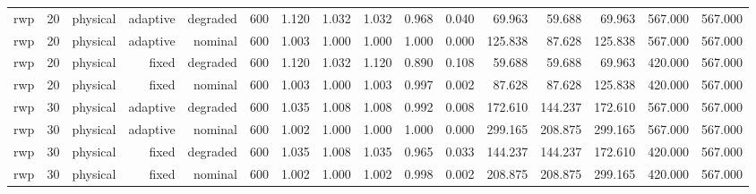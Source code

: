 \begin{tabular}{lrrrrrrrrrrrrrrr}
rwp & 20 & physical & adaptive & degraded & 600 & 1.120 & 1.032 & 1.032 & 0.968 & 0.040 & 69.963 & 59.688 & 69.963 & 567.000 & 567.000 \\
rwp & 20 & physical & adaptive & nominal & 600 & 1.003 & 1.000 & 1.000 & 1.000 & 0.000 & 125.838 & 87.628 & 125.838 & 567.000 & 567.000 \\
rwp & 20 & physical & fixed & degraded & 600 & 1.120 & 1.032 & 1.120 & 0.890 & 0.108 & 59.688 & 59.688 & 69.963 & 420.000 & 567.000 \\
rwp & 20 & physical & fixed & nominal & 600 & 1.003 & 1.000 & 1.003 & 0.997 & 0.002 & 87.628 & 87.628 & 125.838 & 420.000 & 567.000 \\
rwp & 30 & physical & adaptive & degraded & 600 & 1.035 & 1.008 & 1.008 & 0.992 & 0.008 & 172.610 & 144.237 & 172.610 & 567.000 & 567.000 \\
rwp & 30 & physical & adaptive & nominal & 600 & 1.002 & 1.000 & 1.000 & 1.000 & 0.000 & 299.165 & 208.875 & 299.165 & 567.000 & 567.000 \\
rwp & 30 & physical & fixed & degraded & 600 & 1.035 & 1.008 & 1.035 & 0.965 & 0.033 & 144.237 & 144.237 & 172.610 & 420.000 & 567.000 \\
rwp & 30 & physical & fixed & nominal & 600 & 1.002 & 1.000 & 1.002 & 0.998 & 0.002 & 208.875 & 208.875 & 299.165 & 420.000 & 567.000 \\
\bottomrule
\end{tabular}